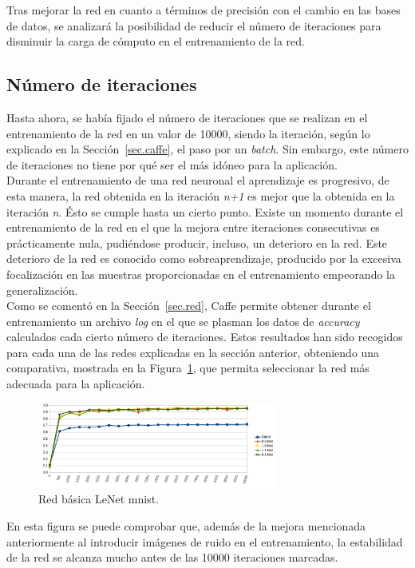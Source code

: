 Tras mejorar la red en cuanto a términos de precisión con el cambio en las bases de datos, se analizará la posibilidad de reducir el número de iteraciones para disminuir la carga de cómputo en el entrenamiento de la red.\\

\subsection{Número de iteraciones}
Hasta ahora, se había fijado el número de iteraciones que se realizan en el entrenamiento de la red en un valor de 10000, siendo la iteración, según lo explicado en la Sección~\ref{sec.caffe}, el paso por un \textit{batch}. Sin embargo, este número de iteraciones no tiene por qué ser el más idóneo para la aplicación.\\

Durante el entrenamiento de una red neuronal el aprendizaje es progresivo, de esta manera, la red obtenida en la iteración \textit{n+1} es mejor que la obtenida en la iteración \textit{n}. Ésto se cumple hasta un cierto punto. Existe un momento durante el entrenamiento de la red en el que la mejora entre iteraciones consecutivas es prácticamente nula, pudiéndose producir, incluso, un deterioro en la red. Este deterioro de la red es conocido como sobreaprendizaje, producido por la excesiva focalización en las muestras proporcionadas en el entrenamiento empeorando la generalización.\\

Como se comentó en la Sección~\ref{sec.red}, Caffe permite obtener durante el entrenamiento un archivo \textit{log} en el que se plasman los datos de \textit{accuracy} calculados cada cierto número de iteraciones. Estos resultados han sido recogidos para cada una de las redes explicadas en la sección anterior, obteniendo una comparativa, mostrada en la Figura~\ref{fig.iteraciones}, que permita seleccionar la red más adecuada para la aplicación.
\begin{figure}[H]
	\begin{center}
		\includegraphics[width=0.7\textwidth]{figures/iteraciones}
		\caption{Red básica LeNet \acrshort{mnist}.}
		\label{fig.iteraciones}
	\end{center}
\end{figure}
En esta figura se puede comprobar que, además de la mejora mencionada anteriormente al introducir imágenes de ruido en el entrenamiento, la estabilidad de la red se alcanza mucho antes de las 10000 iteraciones marcadas.\\

